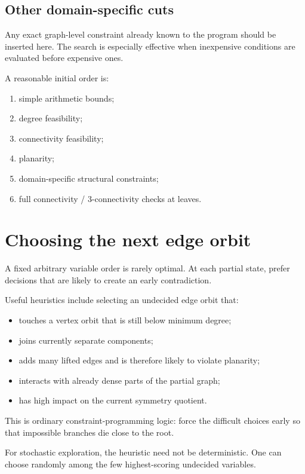 \documentclass[11pt]{article}
\begin{document}
\subsection{Other domain-specific cuts}

Any exact graph-level constraint already known to the program should be inserted here. The search is especially effective when inexpensive conditions are evaluated before expensive ones.

A reasonable initial order is:
\begin{enumerate}
  \item simple arithmetic bounds;
  \item degree feasibility;
  \item connectivity feasibility;
  \item planarity;
  \item domain-specific structural constraints;
  \item full connectivity / 3-connectivity checks at leaves.
\end{enumerate}

\section{Choosing the next edge orbit}

A fixed arbitrary variable order is rarely optimal. At each partial state, prefer decisions that are likely to create an early contradiction.

Useful heuristics include selecting an undecided edge orbit that:
\begin{itemize}
  \item touches a vertex orbit that is still below minimum degree;
  \item joins currently separate components;
  \item adds many lifted edges and is therefore likely to violate planarity;
  \item interacts with already dense parts of the partial graph;
  \item has high impact on the current symmetry quotient.
\end{itemize}

This is ordinary constraint-programming logic: force the difficult choices early so that impossible branches die close to the root.

For stochastic exploration, the heuristic need not be deterministic. One can choose randomly among the few highest-scoring undecided variables.
\end{document}
